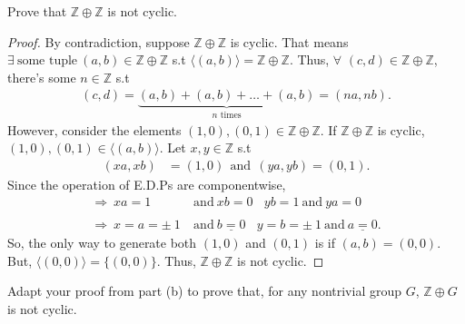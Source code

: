 \documentclass[12pt, letterpaper]{article}
\begin{document}
\quad {} Prove that $\mathbb{Z} \oplus \mathbb{Z}$ is not cyclic. 
\begin{proof}
    By contradiction, suppose $\mathbb{Z}\oplus\mathbb{Z}$ is cyclic. That means $\exists \ \text{some tuple}\ (a,b) \in \mathbb{Z}\oplus\mathbb{Z}$ s.t $\langle(a,b)\rangle = \mathbb{Z}\oplus\mathbb{Z}$. Thus, $\forall$ $(c,d) \in \mathbb{Z}\oplus\mathbb{Z}$, there's some $n\in \mathbb{Z}$ s.t
    \begin{align*}
        (c,d)= \underbrace{(a,b)+(a,b) + \ldots + (a,b)}_{\text{$n$ times}}  = (na,nb).
    \end{align*}
    However, consider the elements $(1,0), (0,1) \in \mathbb{Z}\oplus\mathbb{Z}$. If $\mathbb{Z}\oplus\mathbb{Z}$ is cyclic, $(1,0), (0,1) \in \langle(a,b)\rangle$. Let $x,y \in \mathbb{Z}$ s.t
    \begin{align*}
        (xa,xb) &= (1,0) \ \ \text{and} \ \ (ya,yb) = (0,1).
    \end{align*}
    Since the operation of E.D.Ps are componentwise,
    \begin{align*}
        \Rightarrow \ xa = 1 \ &\text{and} \ xb = 0 \ \  \ \ yb  = 1 \ \text{and} \ ya = 0 \\ \\
        \Rightarrow \ x = a = \pm \ 1 \ &\text{and} \ \underline{b =0} \ \ \ \ y = b = \pm \ 1 \ \text{and} \ \underline{a = 0}. 
    \end{align*}
    So, the only way to generate both $(1,0)$ and $(0,1)$ is if $(a,b) = (0,0)$. But, $\langle(0,0)\rangle = \{(0,0)\}$. Thus, $\mathbb{Z}\oplus\mathbb{Z}$ is not cyclic. 
\end{proof}
  Adapt your proof from part (b) to prove that, for any nontrivial group $G$, $\mathbb{Z}\oplus G$ is not cyclic.
\end{document}
